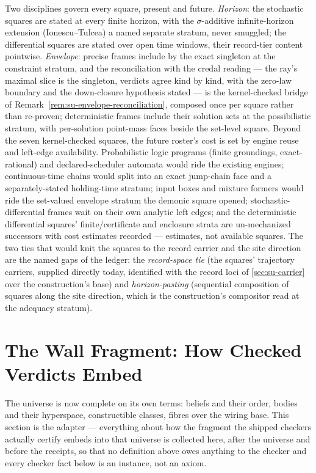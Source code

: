Two disciplines govern every square, present and future.
\emph{Horizon}: the stochastic squares are stated at every finite
horizon, with the
$\sigma$-additive infinite-horizon extension (Ionescu--Tulcea) a
named separate stratum, never smuggled; the differential squares
are stated over open time windows, their record-tier content
pointwise. \emph{Envelope}: precise
frames include by the exact singleton at the constraint stratum,
and the reconciliation with the credal reading --- the ray's
maximal slice is the singleton, verdicts agree kind by kind, with
the zero-law boundary and the down-closure hypothesis stated ---
is the kernel-checked bridge of
Remark~\ref{rem:su-envelope-reconciliation}, composed once per
square rather than re-proven; deterministic frames include their
solution sets at the possibilistic stratum, with per-solution
point-mass faces beside the set-level square. Beyond the seven
kernel-checked squares, the future roster's cost is set by engine
reuse and left-edge availability. Probabilistic logic programs
(finite groundings, exact-rational) and declared-scheduler automata
would ride the existing engines; continuous-time chains would split
into an exact jump-chain face and a separately-stated holding-time
stratum; input boxes and mixture formers would ride the set-valued
envelope stratum the demonic square opened; stochastic-differential
frames wait on their own analytic left edges; and the deterministic
differential squares' finite/certificate and enclosure strata are
un-mechanized successors with cost estimates recorded ---
estimates, not available squares. The two ties that would knit the
squares to the record carrier and the site direction are the named
gaps of the ledger: the \emph{record-space tie} (the squares'
trajectory carriers, supplied directly today, identified with the
record loci of \autoref{sec:su-carrier} over the construction's base)
and \emph{horizon-pasting} (sequential composition of squares along
the site direction, which is the construction's compositor read at the
adequacy stratum).

\section{The Wall Fragment: How Checked Verdicts Embed}
\label{sec:su-checker-anchor}

The universe is now complete on its own terms: beliefs and their
order, bodies and their hyperspace, constructible classes, fibres
over the wiring base. This section is the adapter --- everything
about how the fragment the shipped checkers actually certify
embeds into that universe is collected here, after
the universe and before the receipts, so that no definition above
owes anything to the checker and every checker fact below is an
instance, not an axiom.

